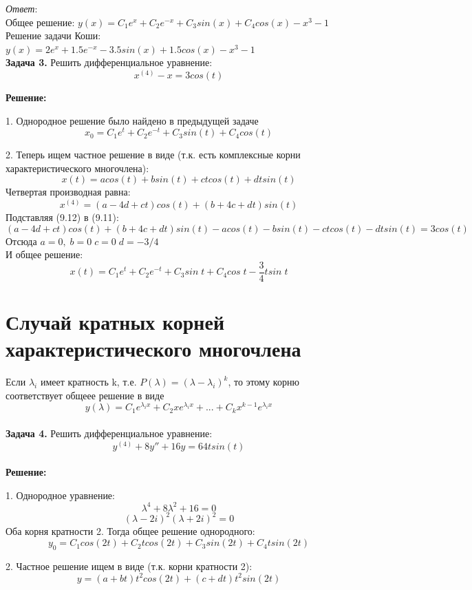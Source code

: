 \documentclass[10pt]{report}
\begin{document}
\textit{Ответ}:\\
Общее решение: $y(x)=C_1e^x+C_2e^{-x}+C_3sin(x)+C_4cos(x)-x^3-1$\\
Решение задачи Коши: $y(x)=2e^x+1.5e^{-x}-3.5sin(x)+1.5cos(x)-x^3-1$\\

\textbf{Задача 3.} Решить дифференциальное уравнение: 
\begin{equation}
x^{(4)}-x=3cos(t)
\end{equation}

\textbf{Решение:} \par
1. Однородное решение было найдено в предыдущей задаче
\[x_{0}=C_1e^t+C_2e^{-t}+C_3sin(t)+C_4cos(t)\]

2. Теперь ищем частное решение в виде (т.к. есть комплексные корни характеристического многочлена):
\begin{equation}
x(t)=acos(t)+bsin(t)+ctcos(t)+dtsin(t)
\end{equation}
Четвертая производная равна:
\[x^{(4)}=(a - 4 d + c t) cos(t) + (b + 4 c + d t) sin(t)\]
Подставляя  (9.12) в (9.11):
\[(a - 4 d + c t) cos(t) + (b + 4 c + d t) sin(t)-acos(t)-bsin(t)-ctcos(t)-dtsin(t)=3cos(t)\]
Отсюда $a=0, \; b=0\; c=0 \; d=-3/4$\\
И общее решение:
\[x(t)=C_1e^t+C_2e^{-t}+C_3sin\;t+C_4cos\;t-\frac 3 4 tsin\;t\]

\section {Случай кратных корней характеристического многочлена}

Если $\lambda_i$ имеет кратность k, т.е. $P(\lambda)=(\lambda-\lambda_i)^k$, то этому корню соответствует общеее  решение в виде
\[y(\lambda)=C_1e^{\lambda_ix}+C_2xe^{\lambda_ix}+...+C_kx^{k-1}e^{\lambda_ix}\]\\
\textbf{Задача 4.} Решить дифференциальное уравнение: 
\begin{equation}
y^{(4)}+8y''+16y=64tsin(t)
\end{equation}\\
\textbf{Решение:} \par
1. Однородное уравнение:
\[\lambda^4+8\lambda^2+16=0\]
\[(\lambda-2i)^2(\lambda+2i)^2=0\]
Оба корня кратности 2. Тогда общее решение однородного:
\[y_0=C_1cos(2t)+C_2tcos(2t)+C_3sin(2t)+C_4tsin(2t)\]

2. Частное решение ищем в виде (т.к. корни кратности 2):
\[y=(a+bt)t^2cos(2t)+(c+dt)t^2sin(2t)\]
\end{document}
